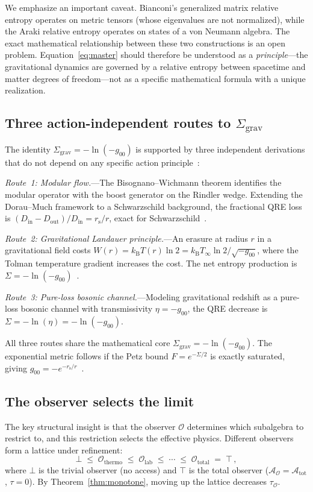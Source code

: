 \documentclass[prd,twocolumn,superscriptaddress,longbibliography,floatfix]{revtex4-2}
\newcommand{\kB}{k_{\mathrm{B}}}
\newcommand{\tauasym}{\tau}
\newcommand{\rs}{r_{\mathrm{s}}}
\newcommand{\Sgrav}{\Sigma_{\mathrm{grav}}}
\newcommand{\Aobs}{\mathcal{A}_{\mathcal{O}}}
\newcommand{\Atot}{\mathcal{A}_{\mathrm{tot}}}
\newcommand{\tauO}{\tauasym_{\mathcal{O}}}
\begin{document}
We emphasize an important caveat.  Bianconi's generalized
matrix relative entropy operates on metric tensors (whose
eigenvalues are not normalized), while the Araki relative
entropy operates on states of a von Neumann algebra.
The exact mathematical relationship between these two
constructions is an open problem.
Equation~\eqref{eq:master} should therefore be understood
as a \emph{principle}---the gravitational dynamics are
governed by a relative entropy between spacetime and matter
degrees of freedom---not as a specific mathematical formula
with a unique realization.

\subsection{Three action-independent routes to $\Sgrav$}

The identity $\Sgrav = -\ln(-g_{00})$ is supported by
three independent derivations that do not depend on any
specific action principle~\cite{Paper2}:

\emph{Route~1: Modular flow.}---The Bisognano--Wichmann
theorem identifies the modular operator with the boost
generator on the Rindler wedge.  Extending the Dorau--Much
framework to a Schwarzschild background, the fractional
QRE loss is $(D_{\mathrm{in}} - D_{\mathrm{out}})/
D_{\mathrm{in}} = \rs/r$, exact for
Schwarzschild~\cite{DorauMuch2025}.

\emph{Route~2: Gravitational Landauer principle.}---An
erasure at radius $r$ in a gravitational field costs
$W(r) = \kB T(r)\ln 2 = \kB T_\infty \ln 2/
\sqrt{-g_{00}}$, where the Tolman temperature gradient
increases the cost.  The net entropy production is
$\Sigma = -\ln(-g_{00})$~\cite{Herrera2020}.

\emph{Route~3: Pure-loss bosonic channel.}---Modeling
gravitational redshift as a pure-loss bosonic channel
with transmissivity $\eta = -g_{00}$, the QRE decrease
is $\Sigma = -\ln(\eta) = -\ln(-g_{00})$.

All three routes share the mathematical core
$\Sgrav = -\ln(-g_{00})$.  The exponential metric
follows if the Petz bound $F = e^{-\Sigma/2}$ is
exactly saturated, giving
$g_{00} = -e^{-\rs/r}$~\cite{Paper2,Yilmaz1958}.

\subsection{The observer selects the limit}

The key structural insight is that the observer
$\mathcal{O}$ determines which subalgebra to restrict
to, and this restriction selects the effective physics.
Different observers form a lattice under refinement:
\begin{equation}
\bot \;\leq\; \mathcal{O}_{\mathrm{thermo}}
\;\leq\; \mathcal{O}_{\mathrm{lab}}
\;\leq\; \cdots \;\leq\; \mathcal{O}_{\mathrm{total}}
\;=\; \top\,,
\label{eq:lattice}
\end{equation}
where $\bot$ is the trivial observer (no access) and
$\top$ is the total observer ($\Aobs = \Atot$,
$\tauasym = 0$).  By Theorem~\ref{thm:monotone},
moving up the lattice decreases $\tauO$.
\end{document}
